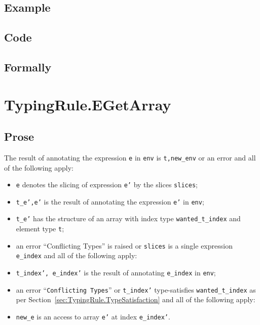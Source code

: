 \documentclass{book}
\begin{document}
  \subsection{Example}

  \subsection{Code}

\begin{emptyformal}
    \subsection{Formally}
\end{emptyformal}


\section{TypingRule.EGetArray \label{sec:TypingRule.EGetArray}}

  \subsection{Prose}
  The result of annotating the expression \texttt{e} in \texttt{env} is
\texttt{t,new\_env} or an error and all of the following apply:
  \begin{itemize}
  \item \texttt{e} denotes the slicing of expression \texttt{e'} by the slices \texttt{slices};
  \item \texttt{t\_e',e'} is the result of annotating the expression \texttt{e'} in \texttt{env};
  \item \texttt{t\_e'} has the structure of an array with index type \texttt{wanted\_t\_index} and element type \texttt{t};
  \item an error ``Conflicting Types'' is raised or \texttt{slices} is a single expression \texttt{e\_index} and all of the following apply:
  \item \texttt{t\_index', e\_index'} is the result of annotating \texttt{e\_index} in \texttt{env};
  \item an error ``\texttt{Conflicting Types}'' or \texttt{t\_index'} type-satisfies \texttt{wanted\_t\_index} as per Section~\ref{sec:TypingRule.TypeSatisfaction} and all of the following apply:
  \item \texttt{new\_e} is an access to array \texttt{e'} at index \texttt{e\_index'}.
  \end{itemize}
\end{document}
